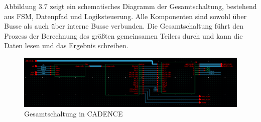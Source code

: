 \vspace{\baselineskip}

\noindent Abbildung 3.7 zeigt ein schematisches Diagramm der Gesamtschaltung, bestehend aus FSM, Datenpfad und Logiksteuerung. Alle Komponenten sind sowohl über Busse als auch über interne Busse verbunden. Die Gesamtschaltung führt den Prozess der Berechnung des größten gemeinsamen Teilers durch und kann die Daten lesen und das Ergebnis schreiben.

\begin{figure}[H]
  \centering
  \includegraphics[width=1.0\textwidth]{images/TOP.png}
  \caption[Gesamtschaltung in CADENCE]{Gesamtschaltung in CADENCE}
  \label{fig:Gesamtschaltung}
\end{figure}

\clearpage


